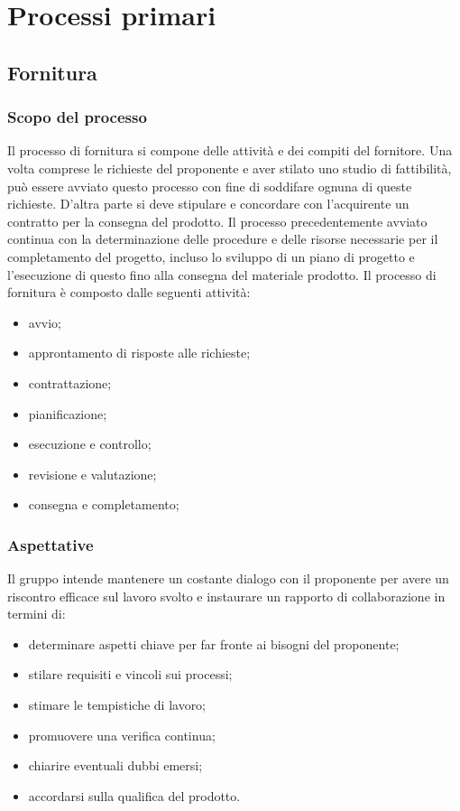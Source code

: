 \section{Processi primari}
\subsection{Fornitura}
\subsubsection{Scopo del processo}
Il processo di fornitura si compone delle attività e dei compiti del fornitore. Una volta comprese le richieste del proponente e aver stilato uno studio di fattibilità, può essere avviato questo processo con fine di soddifare ognuna di queste richieste. D'altra parte si deve stipulare e concordare con l'acquirente un contratto per la consegna del prodotto.
Il processo precedentemente avviato continua con la determinazione delle procedure e delle risorse necessarie per il completamento del progetto, incluso lo sviluppo di un piano di progetto e l'esecuzione di questo fino alla consegna del materiale prodotto.
Il processo di fornitura è composto dalle seguenti attività:
\begin{itemize}
	\item avvio;
	\item approntamento di risposte alle richieste;
	\item contrattazione;
	\item pianificazione;
	\item esecuzione e controllo;
	\item revisione e valutazione;
	\item consegna e completamento;
\end{itemize}
\subsubsection{Aspettative}
Il gruppo intende mantenere un costante dialogo con il proponente per avere un riscontro efficace sul lavoro svolto e instaurare un rapporto di collaborazione in termini di:
\begin{itemize}
	\item determinare aspetti chiave per far fronte ai bisogni del proponente;
	\item stilare requisiti e vincoli sui processi;
	\item stimare le tempistiche di lavoro;
	\item promuovere una verifica continua;
	\item chiarire eventuali dubbi emersi;
	\item accordarsi sulla qualifica del prodotto.
\end{itemize}
